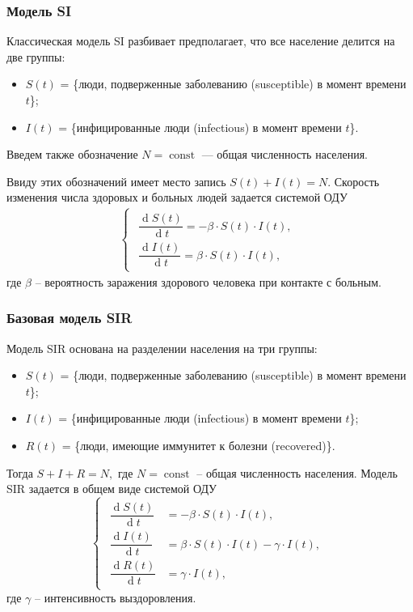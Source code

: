\documentclass[notheorems]{beamer}
\renewcommand{\d}{\operatorname{d}}
\begin{document}
\begin{frame}
	\frametitle{Модель SI}
	Классическая модель SI разбивает предполагает, что все население делится на две группы:
	\begin{itemize}
		\item $S(t)$ = \{люди, подверженные заболеванию (susceptible) в момент времени $t$\};
		\item $I(t)$ = \{инфицированные люди (infectious) в момент времени $t$\}.
	\end{itemize}
	Введем также обозначение $N = \operatorname{const}$ --- общая численность населения.
	
	Ввиду этих обозначений имеет место запись $S(t) + I(t) = N.$
	Скорость изменения числа здоровых и больных людей задается системой ОДУ 
	\begin{eqnarray}
		\left\{ 
		\begin{gathered} 
			\begin{aligned}
				\dfrac{\d S(t)}{\d t} = -\beta\cdot S(t)\cdot I(t),\\
				\dfrac{\d I(t)}{\d t} = \beta\cdot S(t)\cdot I(t),
			\end{aligned}
		\end{gathered} 
		\right.
	\end{eqnarray}
	где $\beta$ -- вероятность заражения здорового человека при контакте с больным.
\end{frame}


\begin{frame}
	\frametitle{Базовая модель SIR}
	Модель SIR основана на разделении населения на три группы: 
	\begin{itemize}
	\item $S(t)$ = \{люди, подверженные заболеванию (susceptible) в момент времени $t$\};
	\item $I(t)$ = \{инфицированные люди (infectious) в момент времени $t$\};
	\item $R(t)$ = \{люди, имеющие иммунитет к болезни (recovered)\}.
	\end{itemize}
	Тогда $S + I + R = N,$ где $N=\operatorname{const}$ -- общая численность населения.
	Модель SIR задается в общем виде системой ОДУ 
	\begin{equation}
		\left\{ 
		\begin{gathered} 
			\begin{aligned}
				\dfrac {\d S(t)}{\d t} &= -\beta \cdot S(t) \cdot I(t),\\
				\dfrac{\d I(t)}{\d t} &= \beta \cdot S(t)\cdot I(t) - \gamma\cdot I(t),\\
				\dfrac{\d R(t)}{\d t} &= \gamma\cdot I(t),
			\end{aligned}
		\end{gathered} 
		\right.
	\end{equation}
	где $\gamma$ -- интенсивность выздоровления.
\end{frame}
\end{document}

